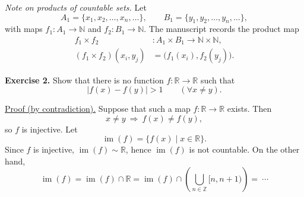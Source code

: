 \medskip
\noindent\emph{Note on products of countable sets.}
Let
\[
 A_1=\{x_1,x_2,\ldots,x_n,\ldots\},\qquad
 B_1=\{y_1,y_2,\ldots,y_n,\ldots\},
\]
with maps $f_1:A_1\to\mathbb N$ and $f_2:B_1\to\mathbb N$.
The manuscript records the product map
\[
\begin{aligned}
 f_1\times f_2 &: A_1\times B_1\longrightarrow
                    \mathbb N\times\mathbb N,\\
 (f_1\times f_2)(x_i,y_j)
   &=\bigl(f_1(x_i),f_2(y_j)\bigr).
\end{aligned}
\]

\medskip
\noindent\textbf{Exercise 2.} Show that there is no function
$f:\mathbb R\to\mathbb R$ such that
\[
 |f(x)-f(y)|>1\qquad(\forall x\neq y).
\]

\noindent\underline{Proof (by contradiction).}
Suppose that such a map $f:\mathbb R\to\mathbb R$ exists.
Then
\[
 x\neq y\ \Longrightarrow\ f(x)\neq f(y),
\]
so $f$ is injective. Let
\[
 \operatorname{im}(f)=\{f(x)\mid x\in\mathbb R\}.
\]
Since $f$ is injective,
$\operatorname{im}(f)\sim\mathbb R$, hence
$\operatorname{im}(f)$ is not countable.
On the other hand,
\[
 \operatorname{im}(f)
  =\operatorname{im}(f)\cap\mathbb R
  =\operatorname{im}(f)\cap
     \left(\bigcup_{n\in\mathbb Z}[n,n+1)\right)
  =\ \cdots
\]
